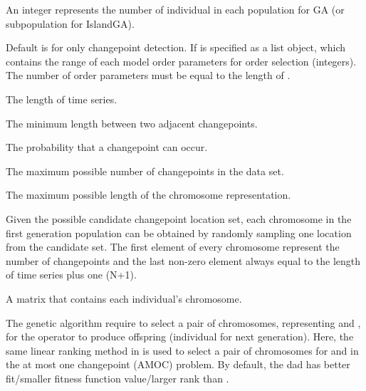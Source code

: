 \documentclass[a4paper]{book}
\begin{document}
\begin{Arguments}
\begin{ldescription}
\item[\code{popsize}] An integer represents the number of individual in each
population for GA (or subpopulation for IslandGA).

\item[\code{p.range}] Default is  for only changepoint detection. If
 is specified as a list object, which contains the range of
each model order parameters for order selection (integers). The number of
order parameters must be equal to the length of .

\item[\code{N}] The length of time series.

\item[\code{minDist}] The minimum length between two adjacent changepoints.

\item[\code{Pchangepoint}] The probability that a changepoint can occur.

\item[\code{mmax}] The maximum possible number of changepoints in the data set.

\item[\code{lmax}] The maximum possible length of the chromosome representation.
\end{ldescription}
\end{Arguments}
%
\begin{Details}
Given the possible candidate changepoint location set, each chromosome in the
first generation population can be obtained by randomly sampling one location
from the candidate set. The first element of every chromosome represent the
number of changepoints and the last non-zero element always equal to the
length of time series plus one (N+1).
\end{Details}
%
\begin{Value}
A matrix that contains each individual's chromosome.
\end{Value}
%
\begin{Description}
The genetic algorithm require to select a pair of chromosomes, representing
 and , for the  operator to
produce offspring (individual for next generation). Here, the same linear
ranking method in  is used to select a pair
of chromosomes for  and  in the at most one changepoint
(AMOC) problem. By default, the dad has better fit/smaller fitness function
value/larger rank than .
\end{Description}
\end{document}
